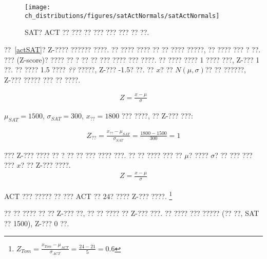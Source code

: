 \begin{figure}
\centering
\texttt{[image: ch\_distributions/figures/satActNormals/satActNormals]}
\caption{SAT? ACT ?? ??? ?? ??? ??? ??? ?? ??.}
\label{satActNormals}
\end{figure}


??~\ref{actSAT}? Z-???? ?????? ????. ?? ???? ???? ?? ?? ???? ?????, ?? ???? ??? ? ??. ??? (Z-score)? ???? ?? ? ?? ?? ??? ???? ??? ????. 
?? ???? ???? 1 ???? ???, Z-??? 1 ??. ?? ???? 1.5 ???? \emph{??} ?????, Z-??? -1.5? ??. ?? $x$? ?? $N(\mu, \sigma)$?? ?? ??????, Z-??? ????? ??? ?? ????.

\begin{eqnarray*}
Z = \frac{x-\mu}{\sigma}
\end{eqnarray*}

$\mu_{SAT}=1500$, $\sigma_{SAT}=300$, $x_{??}=1800$ ??? ????, ?? Z-??? ???:

\begin{eqnarray*}
Z_{??} = \frac{x_{??} - \mu_{SAT}}{\sigma_{SAT}} = \frac{1800-1500}{300} = 1
\end{eqnarray*}

\begin{termBox}{
??? Z-??? ???? ?? ? ?? ?? ??? ???? ???. ?? ?? ???? ??? ?? $\mu$? ???? $\sigma$? ?? ??? ??? ??? $x$? ?? Z-??? ????.
\begin{eqnarray*}
Z = \frac{x-\mu}{\sigma}
\end{eqnarray*}}
\end{termBox}

\begin{exercise}
ACT ??? ????? ?? ??? ACT ?? 24? ???? Z-??? ????.
\footnote{$Z_{Tom} = \frac{x_{Tom} - \mu_{ACT}}{\sigma_{ACT}} = \frac{24 - 21}{5} = 0.6$}
\end{exercise}

?? ?? ???? ?? ?? Z-??? ??, ?? ?? ???? ?? Z-??? ???. ?? ???? ??? ????? (?? ??, SAT ?? 1500), Z-??? $0$ ??.

